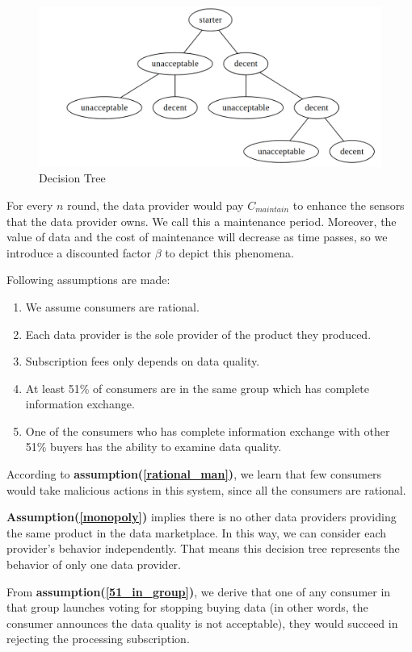 \documentclass[journal,article,submit,moreauthors,pdftex]{Definitions/mdpi}
\begin{document}
\begin{figure}[H] \centering \includegraphics[width=3.3 in]{decision_tree} \caption{Decision Tree}
    \label{fig:decision_tree} \end{figure}
For every $n$ round, the data provider would pay $C_{maintain}$ to enhance the sensors that the data provider owns. We call this a maintenance period. Moreover, the value of data and the cost of maintenance will decrease as time passes, so we introduce a discounted factor $\beta$ to depict this phenomena.

Following assumptions are made:
\begin{enumerate}
    \item  We assume consumers are rational. \label{rational_man}
    \item  Each data provider is the sole provider of the product they produced. \label{monopoly}
    \item  Subscription fees only depends on data quality. \label{fee_vs_quality}
    \item  At least 51\% of consumers are in the same group which has complete information exchange.\label{51_in_group}
    \item  One of the consumers who has complete information exchange with other 51\% buyers has the ability to examine  data quality. \label{1_in_51}
\end{enumerate}

According to \textbf{assumption(\ref{rational_man})}, we learn that few consumers would take malicious actions in this system, since all the consumers are rational.

\textbf{Assumption(\ref{monopoly})} implies there is no other data providers providing the same product in the data marketplace. In this way, we can consider each provider's behavior independently. That means this decision tree represents the behavior of only one data provider.

From \textbf{assumption(\ref{51_in_group})}, we derive that one of any consumer in that group launches voting for stopping buying data (in other words, the consumer announces the data quality is not acceptable), they would succeed in rejecting the processing subscription.
\end{document}
